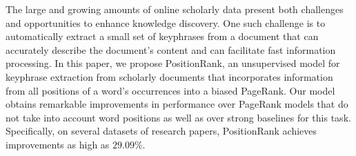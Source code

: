The large and growing amounts of online scholarly data present both challenges and opportunities to enhance knowledge discovery. One such challenge is to automatically extract a small set of keyphrases from a document that can accurately describe the document's content and can facilitate fast information processing. In this paper, we propose PositionRank, an unsupervised model for keyphrase extraction from scholarly documents that incorporates information from all positions of a word's occurrences into a biased PageRank. Our model obtains remarkable improvements in performance over PageRank models that do not take into account word positions as well as over strong baselines for this task. Specifically, on several datasets of research papers, PositionRank achieves improvements as high as $29.09\%$.
